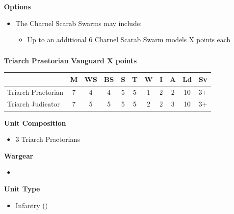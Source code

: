\begin{minipage}[t]{0.72\textwidth}
	\vspace*{2em}
	\textbf{Options}
	\begin{itemize}
		\item The Charnel Scarab Swarms may include:
		\begin{itemize}
			\item Up to an additional 6 Charnel Scarab Swarm models \dotfill X points each
		\end{itemize}
	\end{itemize}
\end{minipage}


\newpage
\subsubsection[Triarch Praetorian Vanguard]{}

\begin{minipage}[t]{0.72\textwidth}
	{\large \textbf{Triarch Praetorian Vanguard \dotfill X points}}
	
	\begin{tabular}{m{160 pt} *{10}{c}}
		& M & WS & BS & S & T & W & I & A & Ld & Sv \\
		\hline
		Triarch Praetorian & 7 & 4 & 4 & 5 & 5 & 1 & 2 & 2 & 10 & 3+ \\
		Triarch Judicator & 7 & 5 & 5 & 5 & 5 & 2 & 2 & 3 & 10 & 3+ \\
	\end{tabular}
	\small
	\begin{minipage}[t]{0.5\textwidth}
		\begin{flushleft}
			\vspace*{2em}
			\textbf{Unit Composition}
			\begin{itemize}
				\item 3 Triarch Praetorians
			\end{itemize}
			
			\textbf{Wargear}
			\begin{itemize}
				\item {}
			\end{itemize}
		\end{flushleft}
	\end{minipage}
	\begin{minipage}[t]{0.5\textwidth}
		\begin{flushleft}
			\vspace*{2em}
			\textbf{Unit Type}
			\begin{itemize}
				\item Infantry (\quickref{Living Metal})
			\end{itemize}
			

\end{flushleft}
\end{minipage}
\end{minipage}
